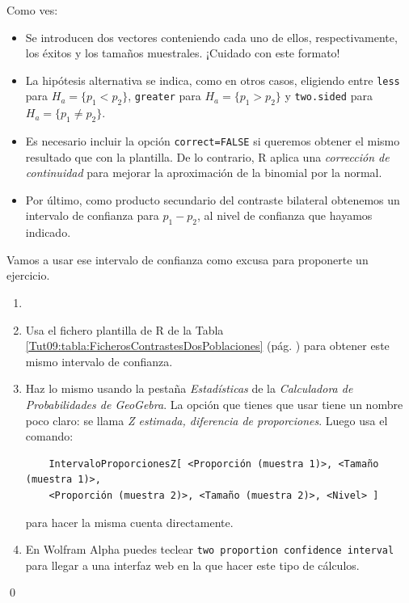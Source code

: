 \documentclass[10pt,a4paper]{article}\usepackage[]{graphicx}\usepackage[]{color}
\newcounter {cont01}
\begin{document}
Como ves:
\begin{itemize}
  \item Se introducen dos vectores conteniendo cada uno de ellos, respectivamente, los éxitos y los tamaños muestrales. ¡Cuidado con este formato!
  \item La hipótesis alternativa se indica, como en otros casos, eligiendo entre {\tt less} para $H_a = \{p_1 < p_2\}$, {\tt greater} para $H_a = \{p_1 > p_2\}$ y {\tt two.sided} para $H_a = \{p_1 \neq p_2\}$.
  \item Es necesario incluir la opción {\tt correct=FALSE} si queremos obtener el mismo resultado que con la plantilla. De lo contrario, R aplica una {\em corrección de continuidad} para mejorar la aproximación de la binomial por la normal.
  \item Por último, como producto secundario del contraste bilateral obtenemos un intervalo de confianza para $p_1 - p_2$, al nivel de confianza que hayamos indicado.
\end{itemize}

Vamos a usar ese intervalo de confianza como excusa para proponerte un ejercicio.

\begin{ejercicio}
\label{tut09:ejercicio01}

\begin{enumerate}
    \item[]
    \item Usa el fichero plantilla de R de la Tabla \ref{Tut09:tabla:FicherosContrastesDosPoblaciones} (pág. \pageref{Tut09:tabla:FicherosContrastesDosPoblaciones}) para obtener este mismo intervalo de confianza.

    \item Haz lo mismo usando la pestaña {\em Estadísticas} de la {\em Calculadora de Probabilidades de GeoGebra}. La opción que tienes que usar tiene un nombre poco claro: se llama {\em Z estimada, diferencia de proporciones}. Luego usa el comando:
       \begin{center}
       {\small
       \begin{verbatim}
    IntervaloProporcionesZ[ <Proporción (muestra 1)>, <Tamaño (muestra 1)>,
    <Proporción (muestra 2)>, <Tamaño (muestra 2)>, <Nivel> ]
        \end{verbatim}
        }
        \end{center}
        para hacer la misma cuenta directamente.

    \item En Wolfram Alpha puedes teclear {\tt two proportion confidence interval } para llegar a una interfaz web en la que hacer este tipo de cálculos.

\end{enumerate}
\qed
\end{ejercicio}
\end{document}
